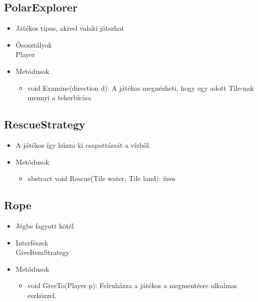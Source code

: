 \subsection{PolarExplorer}
\begin{itemize}
	\item Játékos típus, akivel valaki játszhat\\
	
	\item Ősosztályok\\
	Player
\item Metódusok
\begin{itemize}
	\item void Examine(direction d): A játékos megnézheti, hogy egy adott Tile-nak mennyi a teherbírása
\end{itemize}
\end{itemize}

\subsection{RescueStrategy}
\begin{itemize}
	\item A játékos így húzza ki csapattársát a vízből.\\

\item Metódusok
\begin{itemize}
	\item abstract void Rescue(Tile water, Tile land): üres
\end{itemize}
\end{itemize}

\subsection{Rope}
\begin{itemize}
	\item Jégbe fagyott kötél\\
\item Interfészek\\
GiveItemStrategy
\item Metódusok
\begin{itemize}
	\item void GiveTo(Player p): Felruházza a játékos a megmentésre alkalmas eszközzel.
\end{itemize}
\end{itemize}

